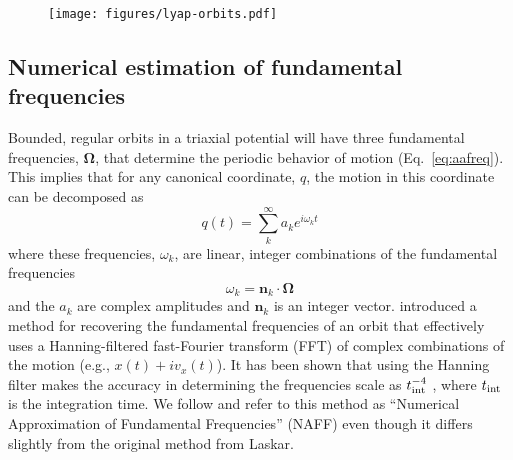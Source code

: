 \documentclass[letterpaper,12pt,preprint]{aastex}
\newcommand{\bs}[1]{\boldsymbol{#1}}
\newcommand{\inttime}{t_{\rm int}}
\begin{document}
\begin{figure}[!h]
\begin{center}
\texttt{[image: figures/lyap-orbits.pdf]}
\caption{ } \label{fig:lyap-orbits}
\end{center}
\end{figure}

\subsection{Numerical estimation of fundamental frequencies}\label{sec:naff}

Bounded, regular orbits in a triaxial potential will have three fundamental frequencies, $\bs{\Omega}$, that determine the periodic behavior of motion (Eq.~\ref{eq:aafreq}). This implies that for any canonical coordinate, $q$, the motion in this coordinate can be decomposed as 
\begin{equation}
	q(t) = \sum^\infty_k a_k e^{i \omega_k t}
\end{equation}
where these frequencies, $\omega_k$, are linear, integer combinations of the fundamental frequencies
\begin{equation}
	\omega_k = \bs{n}_k \cdot \bs{\Omega}
\end{equation}
and the $a_k$ are complex amplitudes and $\bs{n}_k$ is an integer vector. \cite{laskar93} introduced a method for recovering the fundamental frequencies of an orbit that effectively uses a Hanning-filtered fast-Fourier transform (FFT) of complex combinations of the motion (e.g., $x(t) + i v_x(t)$). It has been shown that using the Hanning filter makes the accuracy in determining the frequencies scale as $\inttime^{-4}$ \citep{laskar99}, where $\inttime$ is the integration time. We follow \cite{valluri98} and refer to this method as ``Numerical Approximation of Fundamental Frequencies'' (NAFF) even though it differs slightly from the original method from Laskar.
\end{document}
